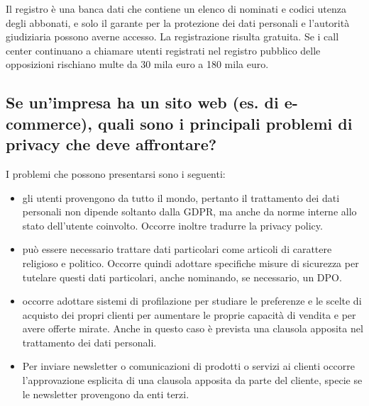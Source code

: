 Il registro è una banca dati che contiene un elenco di nominati e codici utenza
degli abbonati, e solo il garante per la protezione dei dati personali e
l'autorità giudiziaria possono averne accesso.
La registrazione risulta gratuita. Se i call center continuano a chiamare
utenti registrati nel registro pubblico delle opposizioni rischiano multe da 30
mila euro a 180 mila euro.

\subsection{Se un’impresa ha un sito web (es. di e-commerce), quali sono i
principali problemi di privacy che deve affrontare?}

I problemi che possono presentarsi sono i seguenti:
\begin{itemize}
    \item gli utenti provengono da tutto il mondo, pertanto il trattamento dei
        dati personali non dipende soltanto dalla GDPR, ma anche da norme
        interne allo stato dell'utente coinvolto. Occorre inoltre tradurre la
        privacy policy.
    \item può essere necessario trattare dati particolari come articoli di carattere religioso e politico.
    Occorre quindi adottare specifiche misure di sicurezza per tutelare questi
        dati particolari, anche nominando, se necessario, un DPO.
    \item occorre adottare sistemi di profilazione per studiare le preferenze e
        le scelte di acquisto dei propri clienti per aumentare le proprie
        capacità di vendita e per avere offerte mirate. Anche in questo caso è
        prevista una clausola apposita nel trattamento dei dati personali.
    \item Per inviare newsletter o comunicazioni di prodotti o servizi ai
        clienti occorre l'approvazione esplicita di una clausola apposita da
        parte del cliente, specie se le newsletter provengono da enti terzi.

\end{itemize}
